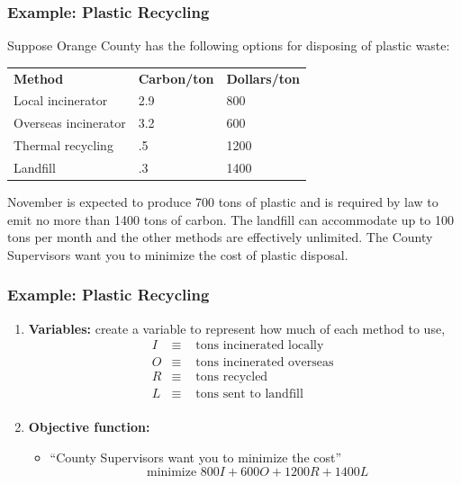 \documentclass{beamer}
\begin{document}
\begin{frame} \frametitle{Example: Plastic Recycling}
  Suppose Orange County has the following options for disposing of plastic waste:
  \begin{center}
  \begin{tabular}{lll}
    \textbf{Method} & \textbf{Carbon/ton} & \textbf{Dollars/ton} \\
    Local incinerator & 2.9 & 800 \\
    Overseas incinerator & 3.2 & 600 \\
    Thermal recycling & .5 & 1200 \\
    Landfill & .3 & 1400 \\
  \end{tabular}
\end{center}
  November is expected to produce 700 tons of plastic and is required by law
  to emit no more than 1400 tons of carbon. The landfill can accommodate up
  to 100 tons per month and the other methods are effectively unlimited.
  The County Supervisors want you to minimize the cost of plastic disposal.
\end{frame}

\begin{frame} \frametitle{Example: Plastic Recycling}
\begin{enumerate}
  \item \textbf{Variables:} create a variable to represent how much of each
    method to use,
    \begin{eqnarray*}
      I &\equiv& \text{ tons incinerated locally } \\
      O &\equiv& \text{ tons incinerated overseas } \\
      R &\equiv& \text{ tons recycled } \\
      L &\equiv& \text{ tons sent to landfill } \\
    \end{eqnarray*}
  \item \textbf{Objective function:}
  \begin{itemize}
    \item ``County Supervisors want you to minimize the cost''
    \[ \text{ minimize } 800I + 600O + 1200R + 1400L \]
  \end{itemize}
\end{enumerate}
\end{frame}
\end{document}
